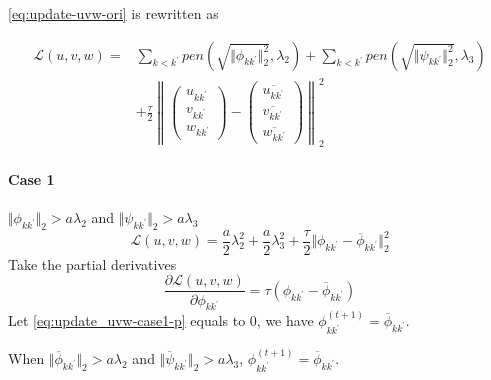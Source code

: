 \documentclass[12pt, a4paper, oneside]{article}
\numberwithin{equation}{section}
\begin{document}
\ref{eq:update-uvw-ori} is rewritten as 

\begin{equation}
	\label{eq:update-uvw-formal}
	\begin{aligned}
		\mathcal{L}(u,v,w)=& \sum_{k<{k^\prime}}pen(\sqrt{\Vert \phi_{k{k^\prime}}\Vert_2^2}, \lambda_2) 
		+\sum_{k<{k^\prime}}pen(\sqrt{\Vert \psi_{k{k^\prime}}\Vert_2^2}, \lambda_3) \\
		&+ \frac{\tau}{2}\left\|\left(\begin{array}{l}
			u_{k k^{\prime}} \\
			v_{k k^{\prime}} \\
			w_{k k^{\prime}}
		\end{array}\right)-\left(\begin{array}{c}
			\overline{u_{k k^{\prime}}} \\
			\overline{v_{k k^{\prime}}} \\
			\overline{w_{k k^{\prime}}}
		\end{array}\right)\right\|_{2}^{2}
	\end{aligned}
\end{equation}
\paragraph{Case 1} $\Vert\phi_{k{k^\prime}}\Vert_2 > a\lambda_2$ and $\Vert\psi_{k{k^\prime}}\Vert_2 > a\lambda_3$
\begin{equation}
\label{eq:update_uvw-case1}
\mathcal{L}(u,v,w) = \frac{a}{2}\lambda_2^2 + \frac{a}{2}\lambda_3^2 + \frac{\tau}{2}\Vert\phi_{k{k^\prime}}-\overline\phi_{k{k^\prime}}\Vert_2^2
\end{equation}
Take the partial derivatives
\begin{equation}
\label{eq:update_uvw-case1-p}
\frac{\partial \mathcal{L}(u,v,w)}{\partial \phi_{k{k^\prime}}} = \tau (\phi_{k{k^\prime}} - \overline\phi_{k{k^\prime}})
\end{equation}
Let \ref{eq:update_uvw-case1-p} equals to 0, we have $\phi_{k{k^\prime}}^{(t+1)} = \overline\phi_{k{k^\prime}}$.

When $\Vert\overline\phi_{k{k^\prime}}\Vert_2 > a\lambda_2$ and $\Vert\overline\psi_{k{k^\prime}}\Vert_2 > a\lambda_3$, $\phi_{k{k^\prime}}^{(t+1)} = \overline\phi_{k{k^\prime}}$.
\end{document}
